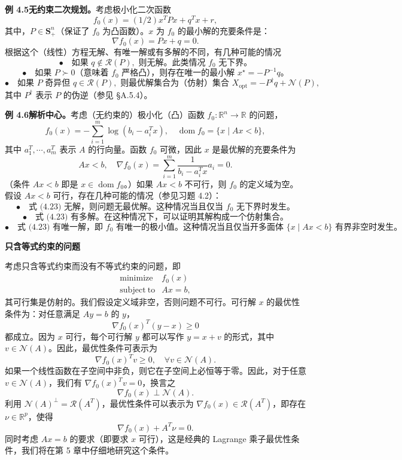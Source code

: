 \documentclass[UTF8,12pt,a4paper,fontset=fandol]{ctexart}
\begin{document}
\noindent\textbf{例 4.5\quad 无约束二次规划。}\quad 考虑极小化二次函数
\[
f_0(x)=(1/2)x^TPx+q^Tx+r,
\]
其中，$P\in\mathbf{S}_+^n$（保证了 $f_0$ 为凸函数）。$x$ 为 $f_0$ 的最小解的充要条件是：
\[
\nabla f_0(x)=Px+q=0.
\]
根据这个（线性）方程无解、有唯一解或有多解的不同，有几种可能的情况
\[
\bullet\quad \text{如果 }q\notin\mathcal{R}(P),\text{ 则无解。此类情况 } f_0\text{ 无下界。}
\]
\[
\bullet\quad \text{如果 }P\succ 0\text{（意味着 }f_0\text{ 严格凸），则存在唯一的最小解 }x^\star=-P^{-1}q。
\]
\[
\bullet\quad \text{如果 }P\text{ 奇异但 }q\in\mathcal{R}(P),\text{ 则最优解集合为（仿射）集合 }X_{\mathrm{opt}}=-P^\dagger q+\mathcal{N}(P),
\]
其中 $P^\dagger$ 表示 $P$ 的伪逆（参见 §A.5.4）。

\noindent\textbf{例 4.6\quad 解析中心。}\quad 考虑（无约束的）极小化（凸）函数 $f_0:\mathbb{R}^n\to\mathbb{R}$ 的问题，
\[
f_0(x)=-\sum_{i=1}^{m}\log(b_i-a_i^Tx),\quad \operatorname{dom} f_0=\{x\mid Ax<b\},
\]
其中 $a_1^T,\cdots,a_m^T$ 表示 $A$ 的行向量。函数 $f_0$ 可微，因此 $x$ 是最优解的充要条件为
\begin{equation}
Ax<b,\quad \nabla f_0(x)=\sum_{i=1}^{m}\frac{1}{b_i-a_i^Tx}a_i=0.
\tag{4.23}
\end{equation}
（条件 $Ax<b$ 即是 $x\in\operatorname{dom} f_0$。）如果 $Ax<b$ 不可行，则 $f_0$ 的定义域为空。假设 $Ax<b$ 可行，存在几种可能的情况（参见习题 4.2）：
\[
\bullet\quad \text{式 (4.23) 无解，则问题无最优解。这种情况当且仅当 }f_0\text{ 无下界时发生。}
\]
\[
\bullet\quad \text{式 (4.23) 有多解。在这种情况下，可以证明其解构成一个仿射集合。}
\]
\[
\bullet\quad \text{式 (4.23) 有唯一解，即 }f_0\text{ 有唯一的极小值。这种情况当且仅当开多面体 }\{x\mid Ax<b\}\text{ 有界非空时发生。}
\]

\noindent\textbf{只含等式约束的问题}

考虑只含等式约束而没有不等式约束的问题，即
\[
\begin{array}{ll}
\mathop{\mathrm{minimize}} & f_0(x)\\
\mathrm{subject\ to} & Ax=b,
\end{array}
\]
其可行集是仿射的。我们假设定义域非空，否则问题不可行。可行解 $x$ 的最优性条件为：对任意满足 $Ay=b$ 的 $y$，
\[
\nabla f_0(x)^T(y-x)\geq 0
\]
都成立。因为 $x$ 可行，每个可行解 $y$ 都可以写作 $y=x+v$ 的形式，其中 $v\in\mathcal{N}(A)$。因此，最优性条件可表示为
\[
\nabla f_0(x)^Tv\geq 0,\quad \forall v\in\mathcal{N}(A).
\]
如果一个线性函数在子空间中非负，则它在子空间上必恒等于零。因此，对于任意 $v\in\mathcal{N}(A)$，我们有 $\nabla f_0(x)^Tv=0$，换言之
\[
\nabla f_0(x)\perp \mathcal{N}(A).
\]
利用 $\mathcal{N}(A)^\perp=\mathcal{R}(A^T)$，最优性条件可以表示为 $\nabla f_0(x)\in\mathcal{R}(A^T)$，即存在 $\nu\in\mathbb{R}^p$，使得
\[
\nabla f_0(x)+A^T\nu=0.
\]
同时考虑 $Ax=b$ 的要求（即要求 $x$ 可行），这是经典的 Lagrange 乘子最优性条件，我们将在第 5 章中仔细地研究这个条件。
\end{document}
